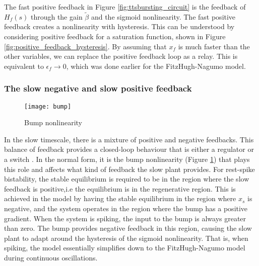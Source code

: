 \documentclass[a4paper, 12pt]{article}
\begin{document}
The fast positive feedback in Figure \ref{fig:ttsbursting_circuit} is the feedback of $H_f(s)$ through the gain $\tilde{\beta}$ and the sigmoid nonlinearity. The fast positive feedback creates a nonlinearity with hysteresis. This can be understood by considering positive feedback for a saturation function, shown in Figure \ref{fig:positive_feedback_hysteresis}. By assuming that $x_f$ is much faster than the other variables, we can replace the positive feedback loop as a relay. This is equivalent to $\epsilon_f\rightarrow 0$, which was done earlier for the FitzHugh-Nagumo model. 

\subsubsection{The slow negative and slow positive feedback}
\begin{figure}[h!]
\texttt{[image: bump]}
\caption{Bump nonlinearity}
\label{fig:bump_nonlinearity}
\end{figure}
In the slow timescale, there is a mixture of positive and negative feedbacks. This balance of feedback provides a closed-loop behaviour that is either a regulator or a switch \cite{drion}. In the normal form, it is the bump nonlinearity (Figure \ref{fig:bump_nonlinearity}) that plays this role and affects what kind of feedback the slow plant provides. For rest-spike bistability, the stable equilibrium is required to be in the region where the slow feedback is positive,i.e the equilibrium is in the regenerative region. This is achieved in the model by having the stable equilibrium in the region where $x_s$ is negative, and the system operates in the region where the bump has a positive gradient. When the system is spiking, the input to the bump is always greater than zero. The bump provides negative feedback in this region, causing the slow plant to adapt around the hysteresis of the sigmoid nonlinearity. That is, when spiking, the model essentially simplifies down to the FitzHugh-Nagumo model during continuous oscillations. 
\end{document}

